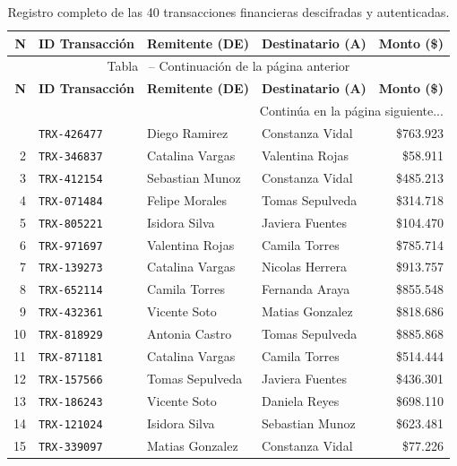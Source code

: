 \documentclass[letter,12pt]{article}
\renewcommand{\tablename}{Tabla}
\begin{document}
{\small
\begin{longtable}{@{}rlllr@{}}
\caption{Registro completo de las 40 transacciones financieras descifradas y autenticadas.} \label{tab:transacciones_completas} \\
\toprule
\textbf{N\textordmasculine{}} & \textbf{ID Transacción} & \textbf{Remitente (DE)} & \textbf{Destinatario (A)} & \textbf{Monto (\$)} \\
\midrule
\endfirsthead
\multicolumn{5}{c}{{\tablename\ \thetable{} -- Continuación de la página anterior}} \\
\toprule
\textbf{N\textordmasculine{}} & \textbf{ID Transacción} & \textbf{Remitente (DE)} & \textbf{Destinatario (A)} & \textbf{Monto (\$)} \\
\midrule
\endhead
\midrule
\multicolumn{5}{r}{{\footnotesize Continúa en la página siguiente...}} \\
\endfoot
\bottomrule
\endlastfoot
1 & \texttt{TRX-426477} & Diego Ramirez & Constanza Vidal & \$763.923 \\
2 & \texttt{TRX-346837} & Catalina Vargas & Valentina Rojas & \$58.911 \\
3 & \texttt{TRX-412154} & Sebastian Munoz & Constanza Vidal & \$485.213 \\
4 & \texttt{TRX-071484} & Felipe Morales & Tomas Sepulveda & \$314.718 \\
5 & \texttt{TRX-805221} & Isidora Silva & Javiera Fuentes & \$104.470 \\
6 & \texttt{TRX-971697} & Valentina Rojas & Camila Torres & \$785.714 \\
7 & \texttt{TRX-139273} & Catalina Vargas & Nicolas Herrera & \$913.757 \\
8 & \texttt{TRX-652114} & Camila Torres & Fernanda Araya & \$855.548 \\
9 & \texttt{TRX-432361} & Vicente Soto & Matias Gonzalez & \$818.686 \\
10 & \texttt{TRX-818929} & Antonia Castro & Tomas Sepulveda & \$885.868 \\
11 & \texttt{TRX-871181} & Catalina Vargas & Camila Torres & \$514.444 \\
12 & \texttt{TRX-157566} & Tomas Sepulveda & Javiera Fuentes & \$436.301 \\
13 & \texttt{TRX-186243} & Vicente Soto & Daniela Reyes & \$698.110 \\
14 & \texttt{TRX-121024} & Isidora Silva & Sebastian Munoz & \$623.481 \\
15 & \texttt{TRX-339097} & Matias Gonzalez & Constanza Vidal & \$77.226 \\

\end{longtable}}
\end{document}
